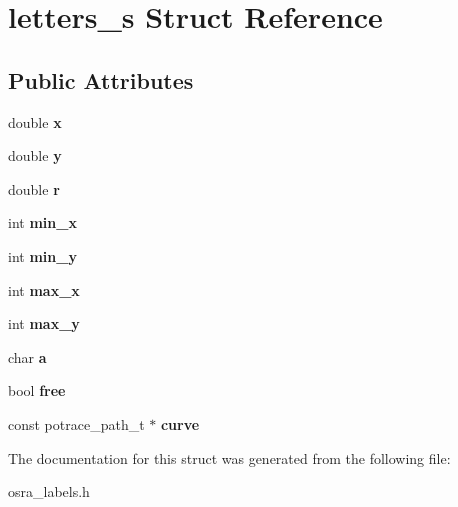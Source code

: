 \hypertarget{structletters__s}{\section{letters\-\_\-s Struct Reference}
\label{structletters__s}
}
\subsection*{Public Attributes}
\begin{DoxyCompactItemize}
\item 
\hypertarget{structletters__s_a1c7018d666b6b314ec07e6149ab8640e}{double {\bfseries x}}\label{structletters__s_a1c7018d666b6b314ec07e6149ab8640e}

\item 
\hypertarget{structletters__s_a6a49fd74ef8745ea5bdb5f09357a7096}{double {\bfseries y}}\label{structletters__s_a6a49fd74ef8745ea5bdb5f09357a7096}

\item 
\hypertarget{structletters__s_a223bb752cc4f9218b016317a9c2406fa}{double {\bfseries r}}\label{structletters__s_a223bb752cc4f9218b016317a9c2406fa}

\item 
\hypertarget{structletters__s_af933c3b15668eb6646e650537a65c3b6}{int {\bfseries min\-\_\-x}}\label{structletters__s_af933c3b15668eb6646e650537a65c3b6}

\item 
\hypertarget{structletters__s_af97557c87dcf0babea3dffe43e545914}{int {\bfseries min\-\_\-y}}\label{structletters__s_af97557c87dcf0babea3dffe43e545914}

\item 
\hypertarget{structletters__s_a69505818443703ef70b6a2c1ba371cbb}{int {\bfseries max\-\_\-x}}\label{structletters__s_a69505818443703ef70b6a2c1ba371cbb}

\item 
\hypertarget{structletters__s_af6d61ed12b8aa41c7d0f8cdf864edc1a}{int {\bfseries max\-\_\-y}}\label{structletters__s_af6d61ed12b8aa41c7d0f8cdf864edc1a}

\item 
\hypertarget{structletters__s_a4cfea48ef8844aeb28632fb4b9e1c7fa}{char {\bfseries a}}\label{structletters__s_a4cfea48ef8844aeb28632fb4b9e1c7fa}

\item 
\hypertarget{structletters__s_a3074550f1308383324e1617f870c6c2e}{bool {\bfseries free}}\label{structletters__s_a3074550f1308383324e1617f870c6c2e}

\item 
\hypertarget{structletters__s_a9cd77cd614676cf78e0310a16236121b}{const potrace\-\_\-path\-\_\-t $\ast$ {\bfseries curve}}\label{structletters__s_a9cd77cd614676cf78e0310a16236121b}

\end{DoxyCompactItemize}


The documentation for this struct was generated from the following file\-:\begin{DoxyCompactItemize}
\item 
osra\-\_\-labels.\-h\end{DoxyCompactItemize}
